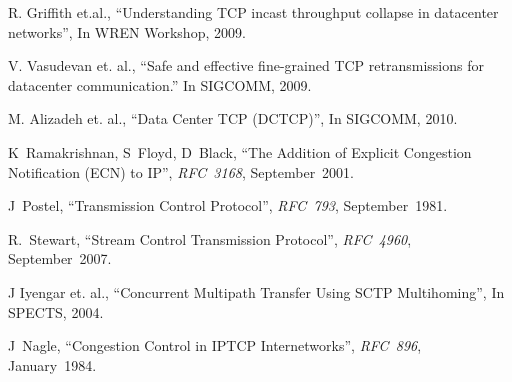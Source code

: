 \documentclass[12pt]{article}
\begin{document}
\begin{thebibliography}{8}

R. Griffith et.al.,
  ``Understanding TCP incast throughput collapse in datacenter networks'', 
  In WREN Workshop, 2009.
  
  V. Vasudevan et. al.,
  ``Safe and effective fine-grained TCP retransmissions for datacenter communication.''
 In SIGCOMM, 2009.
 
 M. Alizadeh et. al.,
 ``Data Center TCP (DCTCP)'',
 In SIGCOMM, 2010.
 
  K~Ramakrishnan, S~Floyd, D~Black,
  ``The Addition of Explicit Congestion Notification (ECN) to IP'',
  \textit{RFC~3168},
  September~2001.
 
  J~Postel,
  ``Transmission Control Protocol'',
  \textit{RFC~793},
  September~1981.
  
 R.~Stewart,
  ``Stream Control Transmission Protocol'',
  \textit{RFC~4960},
 September~2007.
 
 J Iyengar et. al.,
 ``Concurrent Multipath Transfer Using SCTP Multihoming'',
 In SPECTS, 2004.
 
   J~Nagle,
 ``Congestion Control in IP\/TCP Internetworks'',
  \textit{RFC~896},
 January~1984.
 
\end{thebibliography}




\end{document}

